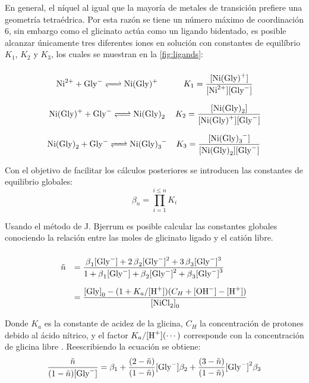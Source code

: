 \documentclass[fleqn,10pt]{SelfArx} %
\begin{document}
    En general, el n\'iquel al igual que la mayor\'ia de metales de transici\'on prefiere una geometr\'ia tetra\'edrica. Por esta raz\'on se tiene un n\'umero m\'aximo de coordinaci\'on 6, sin embargo como el glicinato act\'ua como un ligando bidentado, es posible alcanzar \'unicamente tres diferentes iones en soluci\'on con constantes de equil\'ibrio $K_1$, $K_2$ y $K_3$, los cuales se muestran en la \autoref{fig:ligands}:    
    \footnotesize
    \begin{equation*}
        \begin{array}{cc}
        \ce{Ni^{2+} + Gly- <=> Ni(Gly)+} & K_1 = \dfrac{\ce{[Ni(Gly)+]}}{\ce{[Ni^{2+}][Gly^-]}}\\
        \ce{Ni(Gly)+ + Gly- <=> Ni(Gly)_2} & K_2 = \dfrac{\ce{[Ni(Gly)_2]}}{\ce{[Ni(Gly)+][Gly^-]}}\\
        \ce{Ni(Gly)_2 + Gly- <=> Ni(Gly)_3-} & K_3 = \dfrac{\ce{[Ni(Gly)_3^-]}}{\ce{[Ni(Gly)_2][Gly^-]}}
        \end{array}
    \end{equation*}
    \normalsize
    
    Con el objetivo de facilitar los c\'alculos posteriores se introducen las constantes de equilibrio globales:
    \begin{equation}
	    \beta_n = \prod\limits_{i=1}^{i \leq n} K_i
    \end{equation}
    
    Usando el m\'etodo de J. Bjerrum es posible calcular las constantes globales conociendo la relaci\'on entre las moles de glicinato ligado y el cati\'on libre.
    \small  
    \begin{equation}
    \def\arraystretch{3}
	    \begin{array}{rl}
		    \tilde{n} & = \dfrac{\ce{\beta_1[Gly^-] + 2\beta_2[Gly^-]^2 + 3\beta_3[Gly^-]^3}}{\ce{1 + \beta_1[Gly^-] + \beta_2[Gly^-]^2 + \beta_3[Gly^-]^3}} \\
		    & = \dfrac{\ce{[Gly]}_0 - (1+K_a/\ce{[H+]})(C_H + \ce{[OH^-] - [H+]})}{\ce{[NiCl2]}_0}
	    \end{array}
    \end{equation}
    \normalsize
    
    Donde $K_a$ es la constante de acidez de la glicina, $C_H$ la concentraci\'on de protones debido al \'acido n\'itrico, y el factor $K_a/\ce{[H+]}(\cdots)$ corresponde con la concentraci\'on de glicina libre \ce{[Gly^-]}. Reescribiendo la ecuaci\'on se obtiene:
    \footnotesize
    \begin{equation}
	    \dfrac{\tilde{n}}{(1-\tilde{n})\ce{[Gly^-]}} = \beta_1 + \dfrac{(2-\tilde{n})}{(1-\tilde{n})}\ce{[Gly^-]}\beta_2 + \dfrac{(3-\tilde{n})}{(1-\tilde{n})}\ce{[Gly^-]}^2\beta_3
    \end{equation}
    \normalsize
    
\end{document}
